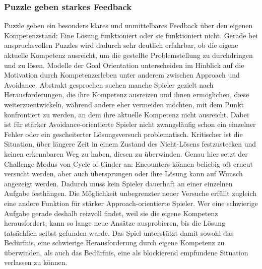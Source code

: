\subsubsection{Puzzle geben starkes Feedback}
Puzzle geben ein besonders klares und unmittelbares Feedback über den eigenen Kompetenzstand: Eine Lösung funktioniert oder sie funktioniert nicht. Gerade bei anspruchsvollen Puzzles wird dadurch sehr deutlich erfahrbar, ob die eigene aktuelle Kompetenz ausreicht, um die gestellte Problemstellung zu durchdringen und zu lösen.
Modelle der Goal Orientation unterscheiden im Hinblick auf die Motivation durch Kompetenzerleben unter anderem zwischen Approach und Avoidance. Abstrakt gesprochen suchen manche Spieler gezielt nach Herausforderungen, die ihre Kompetenz ausreizen und ihnen ermöglichen, diese weiterzuentwickeln, während andere eher vermeiden möchten, mit dem Punkt konfrontiert zu werden, an dem ihre aktuelle Kompetenz nicht ausreicht.
Dabei ist für stärker Avoidance-orientierte Spieler nicht zwangsläufig schon ein einzelner Fehler oder ein gescheiterter Lösungsversuch problematisch. Kritischer ist die Situation, über längere Zeit in einem Zustand des Nicht-Lösens festzustecken und keinen erkennbaren Weg zu haben, diesen zu überwinden. Genau hier setzt der Challenge-Modus von Cycle of Cinder an: Encounters können beliebig oft erneut versucht werden, aber auch übersprungen oder ihre Lösung kann auf Wunsch angezeigt werden. Dadurch muss kein Spieler dauerhaft an einer einzelnen Aufgabe festhängen.
Die Möglichkeit unbegrenzter neuer Versuche erfüllt zugleich eine andere Funktion für stärker Approach-orientierte Spieler. Wer eine schwierige Aufgabe gerade deshalb reizvoll findet, weil sie die eigene Kompetenz herausfordert, kann so lange neue Ansätze ausprobieren, bis die Lösung tatsächlich selbst gefunden wurde. Das Spiel unterstützt damit sowohl das Bedürfnis, eine schwierige Herausforderung durch eigene Kompetenz zu überwinden, als auch das Bedürfnis, eine als blockierend empfundene Situation verlassen zu können.

